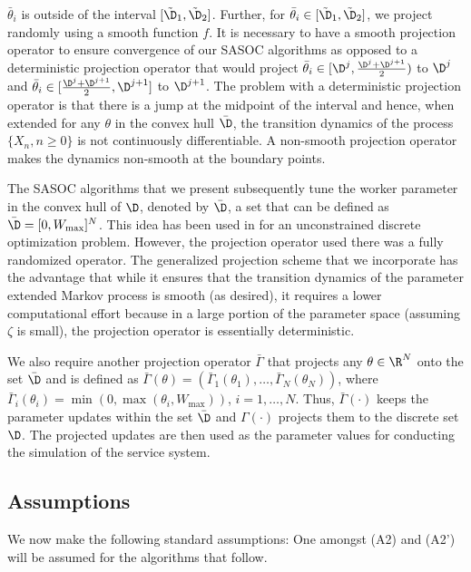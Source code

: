 \documentclass[11pt,letterpaper,english]{article}
\begin{document}
$\bar\theta_i$ is outside of the interval $[\tilde\D_1, \tilde\D_2]$. Further,
for $\bar\theta_i \in [\tilde\D_1, \tilde\D_2]$, we project randomly using a
smooth function $f$. It is necessary to have a smooth projection operator to
ensure convergence of our SASOC algorithms as opposed to a deterministic
projection operator that would project $\bar\theta_i \in
[\D^j,\frac{\D^j+\D^{j+1}}{2})$ to $\D^j$ and $\bar\theta_i \in
[\frac{\D^j+\D^{j+1}}{2}, \D^{j+1}]$ to $\D^{j+1}$. The problem with a
deterministic projection operator is that there is a jump at the midpoint of the interval and hence, when
extended for any $\theta$ in the convex hull $\bar\D$, the transition dynamics
of the process $\{X_n, n\ge0\}$  is not continuously
differentiable. A non-smooth projection operator makes the dynamics non-smooth at the boundary
points.

The SASOC algorithms that we present subsequently tune the worker parameter in
the convex hull of $\D$, denoted by $\bar\D$, a set that can be defined as
$\bar\D = [0, W_{\max}]^N$. This idea has been used in
\citep{shalabh2011stochastic} for an unconstrained discrete
optimization
problem. However, the projection operator used there was a fully randomized
operator. The generalized projection scheme that we incorporate has the
advantage that while it ensures that the transition dynamics of the parameter
extended Markov process is smooth (as desired), it requires a lower
computational effort because in a large portion of the parameter space (assuming
$\zeta$ is small), the projection operator is essentially deterministic.

We also require another projection operator $\bar\Gamma$ that projects any
$\theta \in \R^N$ onto the set $\bar\D$ and is defined as $\bar\Gamma(\theta) =
(\bar\Gamma_1(\theta_1), \ldots, \bar\Gamma_N(\theta_N))$, where
$\bar\Gamma_i(\theta_i) = \min(0, \max(\theta_i, W_{\max}))$, $i=1,\ldots,N$.
Thus, $\bar\Gamma(\cdot)$ keeps the parameter updates within the set $\bar\D$
and $\Gamma(\cdot)$ projects them to the discrete set $\D$. The projected
updates are then used as the parameter values for conducting the simulation of
the service system.

\subsection{Assumptions}
We now make the following standard assumptions: One amongst (A2) and (A2')
will be assumed for the algorithms that follow.
\end{document}
